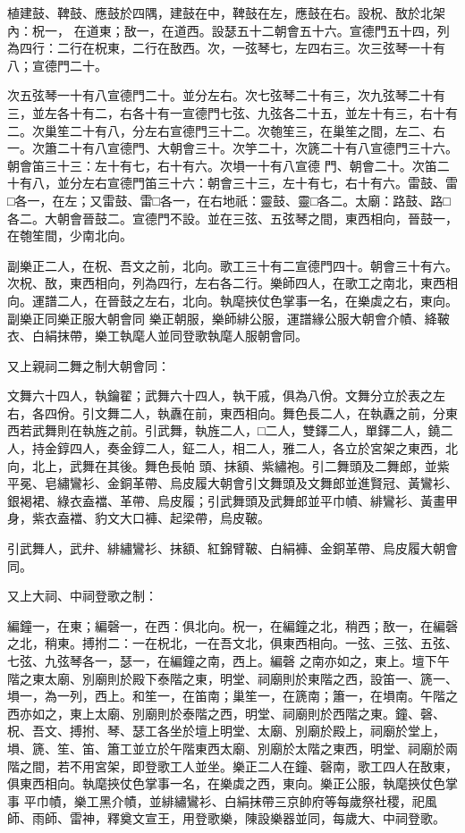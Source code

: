 \begin{pinyinscope}
 植建鼓、鞞鼓、應鼓於四隅，建鼓在中，鞞鼓在左，應鼓在右。設柷、敔於北架內：柷一，
 在道東；敔一，在道西。設瑟五十二朝會五十六。宣德門五十四，列為四行：二行在柷東，二行在敔西。次，一弦琴七，左四右三。次三弦琴一十有八；宣德門二十。



 次五弦琴一十有八宣德門二十。並分左右。次七弦琴二十有三，次九弦琴二十有三，並左各十有二，右各十有一宣德門七弦、九弦各二十五，並左十有三，右十有二。次巢笙二十有八，分左右宣德門三十二。次匏笙三，在巢笙之間，左二、右一。次簫二十有八宣德門、大朝會三十。次竽二十，次篪二十有八宣德門三十六。朝會笛三十三：左十有七，右十有六。次塤一十有八宣德
 門、朝會二十。次笛二十有八，並分左右宣德門笛三十六：朝會三十三，左十有七，右十有六。雷鼓、雷□各一，在左；又雷鼓、雷□各一，在右地祇：靈鼓、靈□各二。太廟：路鼓、路□各二。大朝會晉鼓二。宣德門不設。並在三弦、五弦琴之間，東西相向，晉鼓一，在匏笙間，少南北向。



 副樂正二人，在柷、吾文之前，北向。歌工三十有二宣德門四十。朝會三十有六。次柷、敔，東西相向，列為四行，左右各二行。樂師四人，在歌工之南北，東西相向。運譜二人，在晉鼓之左右，北向。執麾挾仗色掌事一名，在樂虡之右，東向。副樂正同樂正服大朝會同
 樂正朝服，樂師緋公服，運譜緣公服大朝會介幘、絳鞁衣、白絹抹帶，樂工執麾人並同登歌執麾人服朝會同。



 又上親祠二舞之制大朝會同：



 文舞六十四人，執鑰翟；武舞六十四人，執干戚，俱為八佾。文舞分立於表之左右，各四佾。引文舞二人，執纛在前，東西相向。舞色長二人，在執纛之前，分東西若武舞則在執旌之前。引武舞，執旌二人，□二人，雙鐸二人，單鐸二人，鐃二人，持金錞四人，奏金錞二人，鉦二人，相二人，雅二人，各立於宮架之東西，北向，北上，武舞在其後。舞色長帕
 頭、抹額、紫繡袍。引二舞頭及二舞郎，並紫平冕、皂繡鸞衫、金銅革帶、烏皮履大朝會引文舞頭及文舞郎並進賢冠、黃鸞衫、銀褐裙、綠衣盍襠、革帶、烏皮履；引武舞頭及武舞郎並平巾幘、緋鸞衫、黃畫甲身，紫衣盍襠、豹文大口褲、起梁帶，烏皮鞁。



 引武舞人，武弁、緋繡鸞衫、抹額、紅錦臂鞁、白絹褲、金銅革帶、烏皮履大朝會同。



 又上大祠、中祠登歌之制：



 編鐘一，在東；編磬一，在西：俱北向。柷一，在編鐘之北，稍西；敔一，在編磬之北，稍東。搏拊二：一在柷北，一在吾文北，俱東西相向。一弦、三弦、五弦、七弦、九弦琴各一，瑟一，在編鐘之南，西上。編磬
 之南亦如之，東上。壇下午階之東太廟、別廟則於殿下泰階之東，明堂、祠廟則於東階之西，設笛一、篪一、塤一，為一列，西上。和笙一，在笛南；巢笙一，在篪南；簫一，在塤南。午階之西亦如之，東上太廟、別廟則於泰階之西，明堂、祠廟則於西階之東。鐘、磬、柷、吾文、搏拊、琴、瑟工各坐於壇上明堂、太廟、別廟於殿上，祠廟於堂上，塤、篪、笙、笛、簫工並立於午階東西太廟、別廟於太階之東西，明堂、祠廟於兩階之間，若不用宮架，即登歌工人並坐。樂正二人在鐘、磬南，歌工四人在敔東，俱東西相向。執麾挾仗色掌事一名，在樂虡之西，東向。樂正公服，執麾挾仗色掌事
 平巾幘，樂工黑介幘，並緋繡鸞衫、白絹抹帶三京帥府等每歲祭社稷，祀風師、雨師、雷神，釋奠文宣王，用登歌樂，陳設樂器並同，每歲大、中祠登歌。




\end{pinyinscope}
